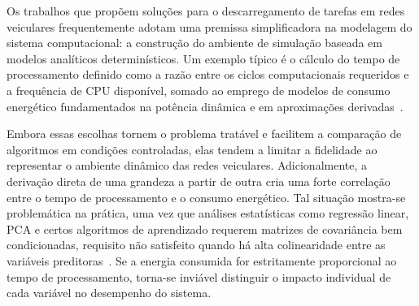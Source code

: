 Os trabalhos que propõem soluções para o descarregamento de tarefas em redes veiculares frequentemente adotam uma premissa simplificadora na modelagem do sistema computacional: a construção do ambiente de simulação baseada em modelos analíticos determinísticos. Um exemplo típico é o cálculo do tempo de processamento definido como a razão entre os ciclos computacionais requeridos e a frequência de \gls{CPU} disponível, somado ao emprego de modelos de consumo energético fundamentados na potência dinâmica e em aproximações derivadas~\cite{rabaey2003digital,mao2016dynamic}.

Embora essas escolhas tornem o problema tratável e facilitem a comparação de algoritmos em condições controladas, elas tendem a limitar a fidelidade ao representar o ambiente dinâmico das redes veiculares. Adicionalmente, a derivação direta de uma grandeza a partir de outra cria uma forte correlação entre o tempo de processamento e o consumo energético. Tal situação mostra-se problemática na prática, uma vez que análises estatísticas como regressão linear, \gls{PCA} e certos algoritmos de aprendizado requerem matrizes de covariância bem condicionadas, requisito não satisfeito quando há alta colinearidade entre as variáveis preditoras~\cite{montgomery2021introduction}. Se a energia consumida for estritamente proporcional ao tempo de processamento, torna-se inviável distinguir o impacto individual de cada variável no desempenho do sistema.

